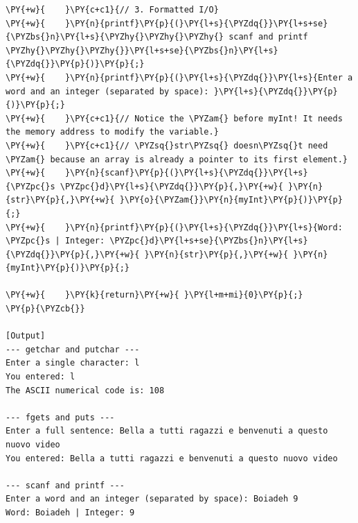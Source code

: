 \begin{Verbatim}[label=\makebox{\url{https://github.com/lucabaldini/cmepda/tree/master/slides/latex/snippets/standard_io.c}},commandchars=\\\{\}]
\PY{+w}{    }\PY{c+c1}{// 3. Formatted I/O}
\PY{+w}{    }\PY{n}{printf}\PY{p}{(}\PY{l+s}{\PYZdq{}}\PY{l+s+se}{\PYZbs{}n}\PY{l+s}{\PYZhy{}\PYZhy{}\PYZhy{} scanf and printf \PYZhy{}\PYZhy{}\PYZhy{}}\PY{l+s+se}{\PYZbs{}n}\PY{l+s}{\PYZdq{}}\PY{p}{)}\PY{p}{;}
\PY{+w}{    }\PY{n}{printf}\PY{p}{(}\PY{l+s}{\PYZdq{}}\PY{l+s}{Enter a word and an integer (separated by space): }\PY{l+s}{\PYZdq{}}\PY{p}{)}\PY{p}{;}
\PY{+w}{    }\PY{c+c1}{// Notice the \PYZam{} before myInt! It needs the memory address to modify the variable.}
\PY{+w}{    }\PY{c+c1}{// \PYZsq{}str\PYZsq{} doesn\PYZsq{}t need \PYZam{} because an array is already a pointer to its first element.}
\PY{+w}{    }\PY{n}{scanf}\PY{p}{(}\PY{l+s}{\PYZdq{}}\PY{l+s}{\PYZpc{}s \PYZpc{}d}\PY{l+s}{\PYZdq{}}\PY{p}{,}\PY{+w}{ }\PY{n}{str}\PY{p}{,}\PY{+w}{ }\PY{o}{\PYZam{}}\PY{n}{myInt}\PY{p}{)}\PY{p}{;}
\PY{+w}{    }\PY{n}{printf}\PY{p}{(}\PY{l+s}{\PYZdq{}}\PY{l+s}{Word: \PYZpc{}s | Integer: \PYZpc{}d}\PY{l+s+se}{\PYZbs{}n}\PY{l+s}{\PYZdq{}}\PY{p}{,}\PY{+w}{ }\PY{n}{str}\PY{p}{,}\PY{+w}{ }\PY{n}{myInt}\PY{p}{)}\PY{p}{;}

\PY{+w}{    }\PY{k}{return}\PY{+w}{ }\PY{l+m+mi}{0}\PY{p}{;}
\PY{p}{\PYZcb{}}

[Output]
--- getchar and putchar ---
Enter a single character: l
You entered: l
The ASCII numerical code is: 108

--- fgets and puts ---
Enter a full sentence: Bella a tutti ragazzi e benvenuti a questo nuovo video
You entered: Bella a tutti ragazzi e benvenuti a questo nuovo video

--- scanf and printf ---
Enter a word and an integer (separated by space): Boiadeh 9
Word: Boiadeh | Integer: 9
\end{Verbatim}